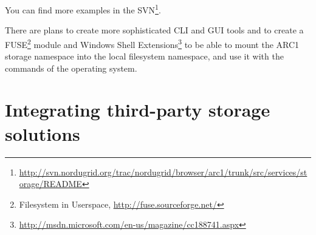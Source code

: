 \documentclass{book}
\begin{document}
You can find more examples in the SVN\footnote{\url{http://svn.nordugrid.org/trac/nordugrid/browser/arc1/trunk/src/services/storage/README}}.

There are plans to create more sophisticated CLI and GUI tools and to create a FUSE\footnote{Filesystem in Userspace, \url{http://fuse.sourceforge.net/}} module and Windows Shell Extensions\footnote{\url{http://msdn.microsoft.com/en-us/magazine/cc188741.aspx}} to be able to mount the ARC1 storage namespace into the local filesystem namespace, and use it with the commands of the operating system.



\section{Integrating third-party storage solutions} %
\label{sec:integrating_third_party_storage_solutions}
\end{document}
